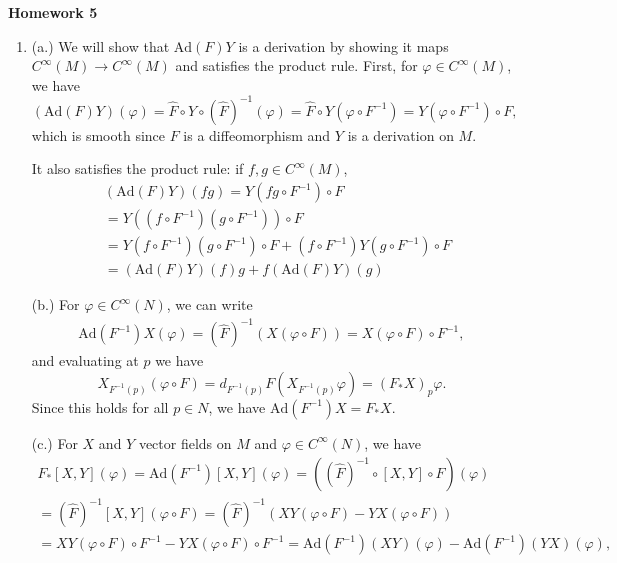 \documentclass[11pt, reqno]{article}
\theoremstyle{plain}
\theoremstyle{definition}
\theoremstyle{remark}
\renewcommand{\phi}{\varphi}
\begin{document}
\topmargin=-40pt
\renewcommand{\headrulewidth}{1pt}
\renewcommand{\headsep}{20pt}
\thispagestyle{fancy}

{\Huge \bfseries \noindent Homework 5}

\begin{enumerate}
    \item[1.] (a.) We will show that $\text{Ad}(F)Y$ is a derivation by showing it maps $C^\infty(M) \to C^\infty(M)$
    and satisfies the product rule. First, for $\phi \in C^\infty(M)$, we have
    \[
        (\text{Ad}(F)Y)(\phi) = \hat{F}\circ Y \circ {(\hat{F})}^{-1}(\phi) = \hat{F}\circ Y(\phi\circ F^{-1}) = Y(\phi \circ F^{-1})\circ F,
    \]
    which is smooth since $F$ is a diffeomorphism and $Y$ is a derivation on $M$. 

    It also satisfies the product rule: if $f, g \in C^\infty(M)$,
    \begin{align*}
        &(\text{Ad}(F)Y)(fg) = Y(fg\circ F^{-1})\circ F\\
        &= Y((f \circ F^{-1})(g\circ F^{-1}))\circ F\\
        &= Y(f \circ F^{-1})(g\circ F^{-1})\circ F + (f \circ F^{-1})Y(g\circ F^{-1})\circ F \\
        &= (\text{Ad}(F)Y)(f)g + f(\text{Ad}(F)Y)(g)
    \end{align*}

    (b.) For $\phi \in C^\infty(N)$, we can write
    \begin{align*}
        \text{Ad}(F^{-1})X(\phi) = (\hat{F})^{-1}(X(\phi \circ F)) = X(\phi \circ F) \circ F^{-1},
    \end{align*}
    and evaluating at $p$ we have
    \[
        X_{F^{-1}(p)}(\phi \circ F) = d_{F^{-1}(p)}F(X_{F^{-1}(p)}\phi) = (F_* X)_p \phi.
    \]
    Since this holds for all $p \in N$, we have $\text{Ad}(F^{-1})X = F_* X$.

    (c.) For $X$ and $Y$ vector fields on $M$ and $\phi \in C^\infty(N)$, we have
    \begin{align*}
        F_*[X, Y](\phi) = \text{Ad}(F^{-1})[X,Y](\phi) = ((\hat{F})^{-1}\circ[X,Y] \circ F)(\phi)\\
        = (\hat{F})^{-1}[X,Y](\phi \circ F) = (\hat{F})^{-1}(XY(\phi \circ F) - YX(\phi \circ F))\\
        = XY(\phi \circ F) \circ F^{-1} - YX(\phi \circ F) \circ F^{-1} = \text{Ad}(F^{-1})(XY)(\phi) - \text{Ad}(F^{-1})(YX)(\phi),
    \end{align*}


\end{enumerate}
\end{document}
